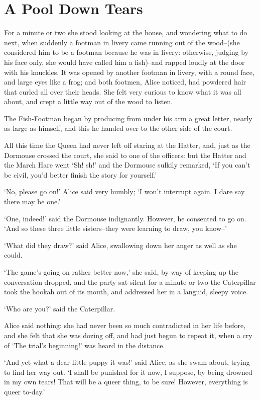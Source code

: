 \documentclass[statementpaper,twoside,openany]{memoir}
\begin{document}
\chapter{A Pool Down Tears}

For a minute or two she stood looking at the house, and wondering what to do next, when suddenly a footman in livery came running out of the wood--(she considered him to be a footman because he was in livery: otherwise, judging by his face only, she would have called him a fish)--and rapped loudly at the door with his knuckles. It was opened by another footman in livery, with a round face, and large eyes like a frog; and both footmen, Alice noticed, had powdered hair that curled all over their heads. She felt very curious to know what it was all about, and crept a little way out of the wood to listen.

The Fish-Footman began by producing from under his arm a great letter, nearly as large as himself, and this he handed over to the other side of the court.

All this time the Queen had never left off staring at the Hatter, and, just as the Dormouse crossed the court, she said to one of the officers: but the Hatter and the March Hare went `Sh! sh!' and the Dormouse sulkily remarked, `If you can't be civil, you'd better finish the story for yourself.'

`No, please go on!' Alice said very humbly; `I won't interrupt again. I dare say there may be one.'

`One, indeed!' said the Dormouse indignantly. However, he consented to go on. `And so these three little sisters--they were learning to draw, you know--'

`What did they draw?' said Alice, swallowing down her anger as well as she could.

`The game's going on rather better now,' she said, by way of keeping up the conversation dropped, and the party sat silent for a minute or two the Caterpillar took the hookah out of its mouth, and addressed her in a languid, sleepy voice.

`Who are you?' said the Caterpillar.

Alice said nothing: she had never been so much contradicted in her life before, and she felt that she was dozing off, and had just begun to repeat it, when a cry of `The trial's beginning!' was heard in the distance.

`And yet what a dear little puppy it was!' said Alice, as she swam about, trying to find her way out. `I shall be punished for it now, I suppose, by being drowned in my own tears! That will be a queer thing, to be sure! However, everything is queer to-day.'
\end{document}
